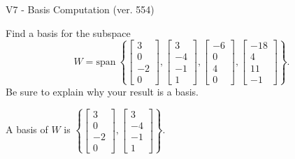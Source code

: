 \begin{exercise}
  \begin{exerciseTitle}V7 - Basis Computation (ver. 554)\end{exerciseTitle}
  \begin{exerciseStatement}
    Find a basis for the subspace 
\[W=\mathrm{span}\ \left\{\left[\begin{array}{r}
3 \\
0 \\
-2 \\
0
\end{array}\right] , \left[\begin{array}{r}
3 \\
-4 \\
-1 \\
1
\end{array}\right] , \left[\begin{array}{r}
-6 \\
0 \\
4 \\
0
\end{array}\right] , \left[\begin{array}{r}
-18 \\
4 \\
11 \\
-1
\end{array}\right]\right\}.\]
 Be sure to explain why your result is a basis.


  \end{exerciseStatement}
  \begin{exerciseAnswer}
   A basis of \(W\) is  \(\left\{\left[\begin{array}{r}
3 \\
0 \\
-2 \\
0
\end{array}\right] , \left[\begin{array}{r}
3 \\
-4 \\
-1 \\
1
\end{array}\right]\right\}\).
  


  \end{exerciseAnswer}
\end{exercise}